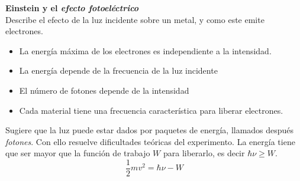 \documentclass[xcolor=dvipsnames,slidestop,compress,mathserif, 11pt]{beamer}
\begin{document}
\begin{frame}
	\textbf{Einstein y el \textit{efecto fotoeléctrico}}\\
	\justifying Describe el efecto de la luz incidente sobre un metal, y como este emite electrones.
	\begin{itemize}
		\item La energía máxima de los electrones es independiente a la intensidad.
		\item La energía depende de la frecuencia de la luz incidente
		\item El número de fotones depende de la intensidad
		\item Cada material tiene una frecuencia característica para liberar electrones.
	\end{itemize}
	\justifying Sugiere que la luz puede estar dados por paquetes de energía, llamados después \textit{fotones}. Con ello resuelve dificultades teóricas del experimento. La energía tiene que ser mayor que la función de trabajo $W$ para liberarlo, es decir $\hbar \nu \geq W$.
	\begin{equation}
		\frac{1}{2}mv^2 = \hbar \nu - W
	\end{equation}
\end{frame}
\end{document}
